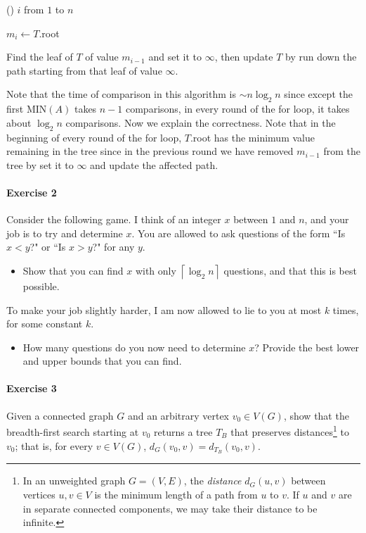 \documentclass[a4paper,12pt]{article}
\newcommand{\ceil}[1]{\left \lceil #1 \right \rceil}
\begin{document}
\begin{itemize}
\begin{algorithm}[H]
		
		\For () {\(i\) from \(1\) to \(n\)} {
			\(m_i \gets T\).root 

			Find the leaf of \(T\) of value \(m_{i - 1}\) and set it to \(\infty \), then update \(T\) by run down the path starting from that leaf of value \(\infty \). 
		}

	\end{algorithm}
	Note that the time of comparison in this algorithm is \(\sim n \log _2 n\) since except the first \(\text{MIN}(A) \) takes \(n - 1\) comparisons, in every round of the for loop, it takes about \(\log _2 n\) comparisons. Now we explain the correctness. Note that in the beginning of every round of the for loop, \(T\).root has the minimum value remaining in the tree since in the previous round we have removed \(m_{i-1}\) from the tree by set it to \(\infty \) and update the affected path.     
\end{itemize}

\paragraph{Exercise 2}  Consider the following game.  I think of an integer $x$ between $1$ and $n$, and your job is to try and determine $x$.  You are allowed to ask questions of the form ``Is $x < y$?" or ``Is $x > y$?" for any $y$.
\begin{itemize}
	\item[(a)] Show that you can find $x$ with only $\ceil{\log_2 n}$ questions, and that this is best possible.
\end{itemize}
To make your job slightly harder, I am now allowed to lie to you at most $k$ times, for some constant $k$.
\begin{itemize}
	\item[(b)] How many questions do you now need to determine $x$?  Provide the best lower and upper bounds that you can find.
\end{itemize}

\paragraph{Exercise 3}  Given a connected graph $G$ and an arbitrary vertex $v_0 \in V(G)$, show that the breadth-first search starting at $v_0$ returns a tree $T_B$ that preserves distances\footnote{In an unweighted graph $G = (V,E)$, the \emph{distance} $d_G(u,v)$ between vertices $u, v \in V$ is the minimum length of a path from $u$ to $v$.  If $u$ and $v$ are in separate connected components, we may take their distance to be infinite.} to $v_0$; that is, for every $v \in V(G)$, $d_G(v_0, v) = d_{T_B}(v_0, v)$.
\end{document}
